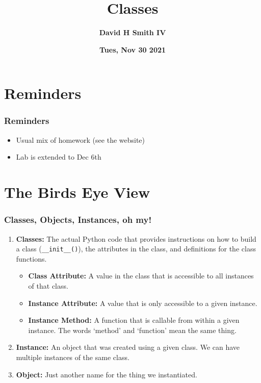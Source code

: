 \documentclass{beamer}
\title{\textbf{Classes}}
\author{\textbf{David H Smith IV}}
\institute[\textbf{UIUC}]{\textbf{University of Illinois Urbana-Champaign}}
\date{\textbf{Tues, Nov 30 2021}}
\begin{document}
\frame{\titlepage}

\section{Reminders}

%
%
\begin{frame}
    \frametitle{Reminders}
    \begin{itemize}
        \item Usual mix of homework (see the website)
        \item Lab is extended to Dec 6th
    \end{itemize}
\end{frame}

\section{The Birds Eye View}

%
%
\begin{frame}[fragile]
    \frametitle{Classes, Objects, Instances, oh my!}
    \begin{enumerate}[A]
        \item \textbf{Classes:} The actual Python code that provides instructions on how to build a class (\lstinline|__init__()|), the attributes in the class, and definitions for the class functions.
            \pause
            \begin{itemize}
                \item \textbf{Class Attribute: } A value in the class that is accessible to all instances of that class.
                    \pause
                \item \textbf{Instance Attribute: } A value that is only accessible to a given instance.
                    \pause
                \item \textbf{Instance Method: } A function that is callable from within a given instance. The words `method' and `function' mean the same thing.
            \end{itemize}
            \pause
        \item \textbf{Instance:} An object that was created using a given class. We can have multiple instances of the same class.
            \pause
        \item \textbf{Object:} Just another name for the thing we instantiated.
    \end{enumerate}
\end{frame}
\end{document}
